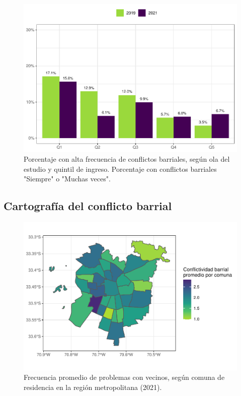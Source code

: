 \documentclass[
  12pt,
]{book}
\begin{document}
\begin{figure}

{\centering \includegraphics{reporte-elsoc_files/figure-latex/confli-quintil-1} 

}

\caption{Porcentaje con alta frecuencia de conflictos barriales, según ola del estudio y quintil de ingreso. Porcentaje con conflictos barriales "Siempre" o "Muchas veces".}\label{fig:confli-quintil}
\end{figure}

\hypertarget{cartografuxeda-del-conflicto-barrial}{%
\subsection{Cartografía del conflicto barrial}\label{cartografuxeda-del-conflicto-barrial}}

\begin{figure}

{\centering \includegraphics{reporte-elsoc_files/figure-latex/confli-comuna-1} 

}

\caption{Frecuencia promedio de problemas con vecinos, según comuna de residencia en la región metropolitana (2021).}\label{fig:confli-comuna}
\end{figure}
\end{document}
